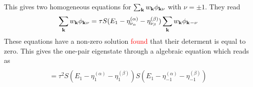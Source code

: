\documentclass[11pt]{article} %
\newcommand{\ns}[1]{\textcolor{red}{#1}}
\begin{document}
This gives two homogeneous equations for $\sum_{\mathbf{k}}w_{\mathbf{k}}\phi_{\mathbf{k}\nu}$ with $\nu=\pm1$. They read
\begin{equation}
[1-v_{\nu}S(E_1-\eta_{\nu_{\alpha}}^{(\alpha)}-\eta_{\nu_{\beta}}^{(\beta)})]\sum_{\vk}w_{\vk}\phi_{\vk^{}\nu}
=\tau{}S(E_1-\eta_{\nu_{\alpha}}^{(\alpha)}-\eta_{\nu_{\beta}}^{(\beta)})\sum_{\vk}w_{\vk}\phi_{\vk^{}-\nu}
\end{equation}
These equations have a non-zero solution \ns{found} that their determent is equal to zero.  This gives the one-pair eigenstate through a algebraic  equation which reads as 
\begin{multline}
[1-v_{1}S(E_1-\eta_{1}^{(\alpha)}-\eta_{1}^{(\beta)})][1-v_{-1}S(E_1-\eta_{-1}^{(\alpha)}-\eta_{-1}^{(\beta)})]\\
=\tau^2S(E_1-\eta_{1}^{(\alpha)}-\eta_{1}^{(\beta)})S(E_1-\eta_{-1}^{(\alpha)}-\eta_{-1}^{(\beta)})
\end{multline}






\end{document}
